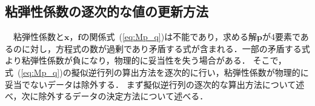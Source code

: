 \documentclass[a4paper]{jarticle}
\begin{document}
\subsection{粘弾性係数の逐次的な値の更新方法}\label{subsec:downsample}
　粘弾性係数と$\boldsymbol{x}$，$\boldsymbol{f}$の関係式~(\ref{eq:Mp_q})は不能であり，求める解$\mathbf{p}$が4要素であるのに対し，方程式の数が過剰であり矛盾する式が含まれる．一部の矛盾する式より粘弾性係数が負になり，物理的に妥当性を失う場合がある．
そこで，式~(\ref{eq:Mp_q})の擬似逆行列の算出方法を逐次的に行い，粘弾性係数が物理的に妥当でないデータは除外する．
まず擬似逆行列の逐次的な算出方法について述べ，次に除外するデータの決定方法について述べる．
\end{document}
